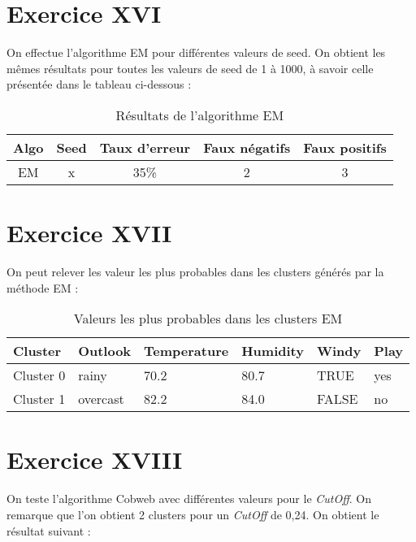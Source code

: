 \documentclass[a4paper, 11pt]{report}
\begin{document}
        
        \section{Exercice XVI}
        On effectue l'algorithme EM pour différentes valeurs de seed. On obtient les mêmes résultats pour toutes les valeurs de seed de 1 à 1000, à savoir celle présentée dans le tableau ci-dessous : 
        \begin{table}[h!]
        \centering
        \begin{tabular}{| c | c | c | c | c |}
        \hline
         Algo & Seed & Taux d'erreur & Faux négatifs & Faux positifs  \\
         \hline
         EM & x & 35\% & 2 & 3 \\
         \hline
         
        \end{tabular}
        \caption{Résultats de l'algorithme EM}
        \label{tab:exo16}
        \end{table}
        
        \section{Exercice XVII}
        On peut relever les valeur les plus probables dans les clusters générés par la méthode EM :
        \begin{table}[h!]
        \centering
        \begin{tabular}{| l | l | l | l | l | l |}
        \hline
        Cluster & Outlook & Temperature & Humidity & Windy & Play \\
        \hline
        Cluster 0 & rainy & 70.2 & 80.7 & TRUE & yes \\
        \hline
        Cluster 1 & overcast & 82.2 & 84.0 & FALSE & no \\
        \hline

        \end{tabular}
        \caption{Valeurs les plus probables dans les clusters EM}
        \label{tab:exo_6}
        \end{table}
        
        \section{Exercice XVIII}
        On teste l'algorithme Cobweb avec différentes valeurs pour le \emph{CutOff}. On remarque que l'on obtient 2 clusters pour un \emph{CutOff} de 0,24. On obtient le résultat suivant : 
        
\end{document}
